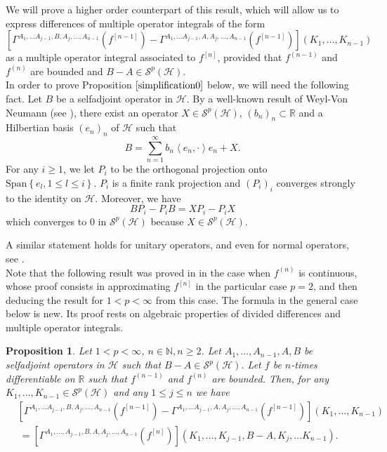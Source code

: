 \documentclass[12pt]{amsart}
\newtheorem{proposition}[theorem]{Proposition}
\theoremstyle{remark}
\begin{document}
We will prove a higher order counterpart of this result, which will allow us to express differences of multiple operator integrals of the form
$$
\left[ \Gamma^{A_1, \ldots A_{j-1}, B, A_j, \ldots, A_{n-1}}(f^{[n-1]}) - \Gamma^{A_1, \ldots A_{j-1}, A, A_j, \ldots, A_{n-1}}(f^{[n-1]})\right] (K_1, \ldots, K_{n-1})
$$
as a multiple operator integral associated to $f^{[n]}$, provided that $f^{(n-1)}$ and $f^{(n)}$ are bounded and $B-A \in \mathcal{S}^p(\mathcal{H})$.\\

In order to prove Proposition $\ref{simplification0}$ below, we will need the following fact. Let $B$ be a selfadjoint operator in $\mathcal{H}$. By a well-known result of Weyl-Von Neumann (see \cite[Theorem 38.1]{Conway}), there exist an operator $X \in \mathcal{S}^p(\mathcal{H})$, $(b_n)_n \subset{\mathbb{R}}$ and a Hilbertian basis $(e_n)_n$ of $\mathcal{H}$ such that
$$
B = \sum_{n=1}^{\infty} b_n \left\langle e_n, \cdot \right\rangle e_n + X.
$$
For any $i\geq 1$, we let $P_i$ to be the orthogonal projection onto $\text{Span}\left\lbrace e_l, 1\leq l \leq i \right\rbrace.$ $P_i$ is a finite rank projection and $(P_i)_i$ converges strongly to the identity on $\mathcal{H}$. Moreover, we have
$$
BP_i - P_iB = XP_i - P_iX
$$
which converges to $0$ in $\mathcal{S}^p(\mathcal{H})$ because $X \in \mathcal{S}^p(\mathcal{H})$.

A similar statement holds for unitary operators, and even for normal operators, see \cite{Berg}.\\


Note that the following result was proved in \cite[Lemma 3.10]{LMS} in the case when $f^{(n)}$ is continuous, whose proof consists in approximating $f^{[n]}$ in the particular case $p=2$, and then deducing the result for $1 < p < \infty$ from this case. The formula in the general case below is new. Its proof rests on algebraic properties of divided differences and multiple operator integrals.


\begin{proposition}\label{simplification0}
Let $1 < p < \infty$, $n \in \mathbb{N}, n \geq 2$. Let $A_1, \ldots, A_{n-1}, A, B$ be selfadjoint operators in $\mathcal{H}$ such that $B-A \in \mathcal{S}^p(\mathcal{H})$. Let $f$ be $n$-times differentiable on $\mathbb{R}$ such that $f^{(n-1)}$ and $f^{(n)}$ are bounded. Then, for any $K_1, \ldots, K_{n-1} \in \mathcal{S}^p(\mathcal{H})$ and any $1 \leq j \leq n$ we have
\begin{align*}
& \left[ \Gamma^{A_1, \ldots A_{j-1}, B, A_j, \ldots, A_{n-1}}(f^{[n-1]}) - \Gamma^{A_1, \ldots A_{j-1}, A, A_j, \ldots, A_{n-1}}(f^{[n-1]})\right] (K_1, \ldots, K_{n-1}) \\
& \ = \left[ \Gamma^{A_1, \ldots, A_{j-1}, B, A, A_j, \ldots, A_{n-1}}(f^{[n]})\right](K_1, \ldots, K_{j-1}, B-A, K_j, \ldots K_{n-1}).
\end{align*}
\end{proposition}
\end{document}
